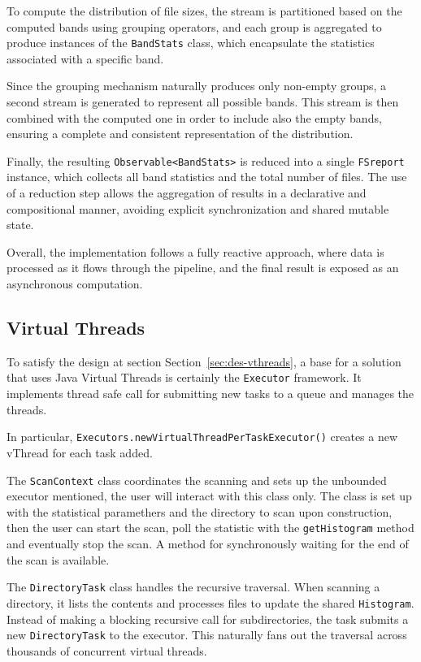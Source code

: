 \documentclass{scrartcl}
\begin{document}
To compute the distribution of file sizes, the stream is partitioned based on the computed bands using grouping operators, and each group is aggregated to produce instances of the \texttt{BandStats} class, which encapsulate the statistics associated with a specific band.

Since the grouping mechanism naturally produces only non-empty groups, a second stream is generated to represent all possible bands. This stream is then combined with the computed one in order to include also the empty bands, ensuring a complete and consistent representation of the distribution.

Finally, the resulting \texttt{Observable<BandStats>} is reduced into a single \texttt{FSreport} instance, which collects all band statistics and the total number of files. The use of a reduction step allows the aggregation of results in a declarative and compositional manner, avoiding explicit synchronization and shared mutable state.

Overall, the implementation follows a fully reactive approach, where data is processed as it flows through the pipeline, and the final result is exposed as an asynchronous computation.

\subsection{Virtual Threads}
To satisfy the design at section Section~\ref{sec:des-vthreads}, a base for a solution that uses Java Virtual Threads is certainly the \texttt{Executor} framework. It implements thread safe call for submitting new tasks to a queue and manages the threads.

In particular, \texttt{Executors.newVirtualThreadPerTaskExecutor()} creates a new vThread for each task added.

The \texttt{ScanContext} class coordinates the scanning and sets up the unbounded executor mentioned, the user will interact with this class only. The class is set up with the statistical paramethers and the directory to scan upon construction, then the user can start the scan, poll the statistic with the \texttt{getHistogram} method and eventually stop the scan. A method for synchronously waiting for the end of the scan is available.

The \texttt{DirectoryTask} class handles the recursive traversal. When scanning a directory, it lists the contents and processes files to update the shared \texttt{Histogram}. Instead of making a blocking recursive call for subdirectories, the task submits a new \texttt{DirectoryTask} to the executor. This naturally fans out the traversal across thousands of concurrent virtual threads.
\end{document}
